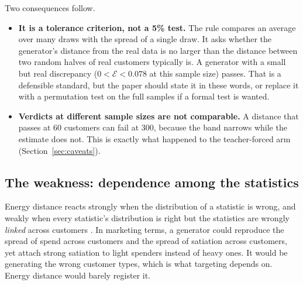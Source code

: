\documentclass[11pt]{article}
\begin{document}
Two consequences follow.
\begin{itemize}
\item \textbf{It is a tolerance criterion, not a 5\% test.} The rule compares an
  average over many draws with the spread of a single draw. It asks whether the
  generator's distance from the real data is no larger than the distance between
  two random halves of real customers typically is. A generator with a small but
  real discrepancy ($0 < \mathcal{E} < 0.078$ at this sample size) passes. That
  is a defensible standard, but the paper should state it in these words, or
  replace it with a permutation test on the full samples if a formal test is
  wanted.
\item \textbf{Verdicts at different sample sizes are not comparable.} A distance
  that passes at 60 customers can fail at 300, because the band narrows while
  the estimate does not. This is exactly what happened to the teacher-forced
  arm (Section~\ref{sec:caveats}).
\end{itemize}

\subsection{The weakness: dependence among the statistics}\label{sec:weakness}

Energy distance reacts strongly when the distribution of a statistic is wrong,
and weakly when every statistic's distribution is right but the statistics are
wrongly \emph{linked} across customers \citep{pinson2013}. In marketing terms, a
generator could reproduce the spread of spend across customers and the spread of
satiation across customers, yet attach strong satiation to light spenders
instead of heavy ones. It would be generating the wrong customer types, which
is what targeting depends on. Energy distance would barely register it.
\end{document}
